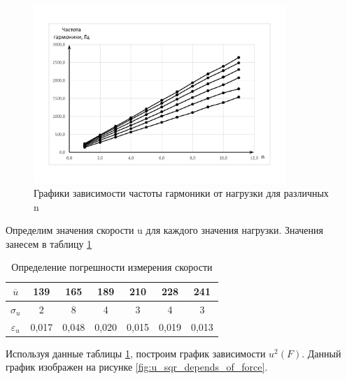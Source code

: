 \documentclass[12pt,a4paper]{article}
\begin{document}
\begin{figure}[h!]
	\begin{center}
		\includegraphics[width = 0.85\textwidth]{Results_of_measuring (1)}
		\caption{Графики зависимости частоты гармоники от нагрузки для различных n}
		\label{fig:grapfic_frequency_force_depend}
	\end{center}
\end{figure}

Определим значения скорости u для каждого значения нагрузки. Значения занесем в таблицу \ref{tab:velocity_with_mistakes}

\begin{table}[h]
\centering
\begin{tabular}{|c|c|c|c|c|c|c|}
\hline
$\overline{u}$  & 139 & 165 & 189 & 210 & 228 & 241 \\ \hline
$\sigma_{u}$     & 2   & 8   & 4   & 3   & 4   & 3   \\ \hline
$\varepsilon_{u}$   & 0,017 & 0,048 & 0,020 & 0,015 & 0,019 & 0,013 \\ \hline
\end{tabular}
\caption{Определение погрешности измерения скорости}
\label{tab:velocity_with_mistakes}
\end{table}

Используя данные таблицы \ref{tab:velocity_with_mistakes}, построим график зависимости $u^{2}\left(F\right)$. Данный график изображен на рисунке \ref{fig:u_sqr_depends_of_force}.
\end{document}
